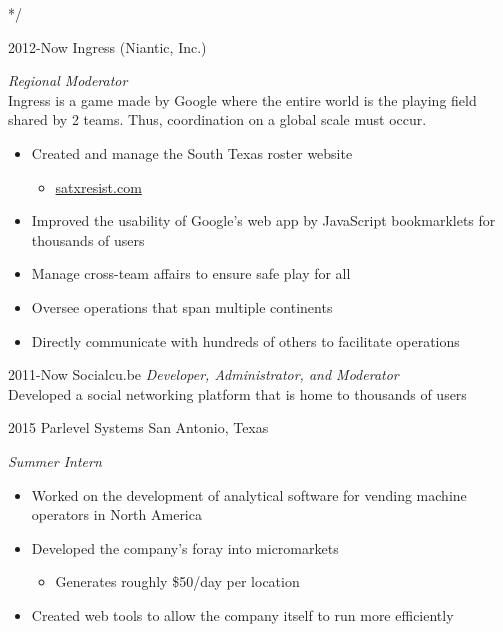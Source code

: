 \documentclass[]{friggeri-cv} %
\begin{document}
*/ 


\begin{entrylist}

\entry
{2012-Now}
{Ingress (Niantic, Inc.)}
{}
{\emph{Regional Moderator} \\ 
Ingress is a game made by Google where the entire world is the playing field shared by 2 teams. Thus, coordination on a global scale must occur. 
	\begin{itemize}
	\item Created and manage the South Texas roster website 
	\begin{itemize}
		\item \href{http://satxresist.com}{satxresist.com}
	\end{itemize}
	\item Improved the usability of Google's web app by JavaScript bookmarklets for thousands of users 
	\item Manage cross-team affairs to ensure safe play for all 
	\item Oversee operations that span multiple continents 
	\item Directly communicate with hundreds of others to facilitate operations 
	\end{itemize}
	}


\entry
{2011-Now}
{Socialcu.be}
{}
{\emph{Developer, Administrator, and Moderator} \\
Developed a social networking platform that is home to thousands of users}


\entry
{2015}
{Parlevel Systems}
{San Antonio, Texas}
{\emph{Summer Intern} 
	\begin{itemize}
	\item Worked on the development of analytical software for vending machine operators in North America 
	\item Developed the company's foray into micromarkets 
	\begin{itemize}
		\item Generates roughly \$50/day per location 
	\end{itemize}
	\item Created web tools to allow the company itself to run more efficiently
	\end{itemize}
	}


\end{entrylist}
\end{document}
